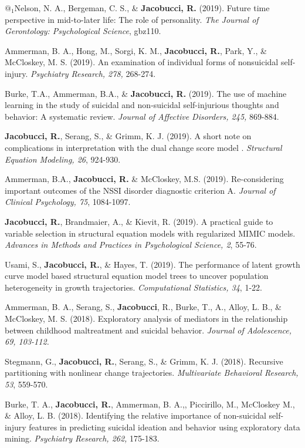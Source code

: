 \documentclass[letterpaper,10pt]{article}
\begin{document}
\begin{etaremune}
	\item  $@_1$Nelson, N. A., Bergeman, C. S., \& \textbf{Jacobucci, R.} (2019). Future time perspective in mid-to-later life: The role of personality. \emph{The Journal of Gerontology: Psychological Science}, gbz110.
	\item  Ammerman, B. A., Hong, M., Sorgi, K. M., \textbf{Jacobucci, R.}, Park, Y., \& McCloskey, M. S. (2019). An examination of individual forms of nonsuicidal self-injury. \emph{Psychiatry Research, 278,} 268-274.
	\item  Burke, T.A., Ammerman, B.A., \& \textbf{Jacobucci, R.} (2019). The use of machine learning in the study of suicidal and non-suicidal self-injurious thoughts and behavior: A systematic review. \emph{Journal of Affective Disorders, 245,} 869-884.
	\item  \textbf{Jacobucci, R.}, Serang, S., \& Grimm, K. J. (2019). A short note on complications in interpretation with the dual change score model . \emph{Structural Equation Modeling, 26}, 924-930.
	\item  Ammerman, B.A., \textbf{Jacobucci, R.} \& McCloskey, M.S. (2019). Re-considering important outcomes of the NSSI disorder diagnostic criterion A. \emph{Journal of Clinical Psychology, 75}, 1084-1097.
	\item  \textbf{Jacobucci, R.}, Brandmaier, A., \& Kievit, R. (2019). A practical guide to variable selection in structural equation models with regularized MIMIC models. \emph{Advances in Methods and Practices in Psychological Science, 2}, 55-76.  
	\item  Usami, S., \textbf{Jacobucci, R.}, \& Hayes, T. (2019). The performance of latent growth curve model based structural equation model trees to uncover population heterogeneity in growth trajectories. \emph{Computational Statistics, 34}, 1-22.
	\item Ammerman, B. A., Serang, S., \textbf{Jacobucci}, R., Burke, T., A., Alloy, L. B., \& McCloskey, M. S. (2018). Exploratory analysis of mediators in the relationship between childhood maltreatment and suicidal behavior. \emph{Journal of Adolescence, 69, 103-112.}
	\item Stegmann, G., \textbf{Jacobucci, R.}, Serang, S., \& Grimm, K. J. (2018). Recursive partitioning with nonlinear change trajectories. \emph{Multivariate Behavioral Research, 53}, 559-570.
	\item Burke, T. A., \textbf{Jacobucci, R.}, Ammerman, B. A.,, Piccirillo, M., McCloskey M., \& Alloy, L. B. (2018). Identifying the relative importance of non-suicidal self-injury features in predicting suicidal ideation and behavior using exploratory data mining. \emph{Psychiatry Research, 262,} 175-183.

\end{etaremune}
\end{document}
